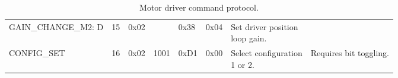 \begin{sidewaystable}[]
\begin{tabular}{llllllll}
GAIN\_CHANGE\_M2: D & 15                    & 0x02                  &                                  & 0x38                   & 0x04                    & \pbox{20cm}{Set driver position\\ loop gain.}       &                        \\
CONFIG\_SET        & 16                    & 0x02                  & 1001                             & 0xD1                   & 0x00                    & \pbox{20cm}{Select configuration\\ 1 or 2.}         & Requires bit toggling.
\end{tabular}
\caption{Motor driver command protocol.}
\label{tbl:motor-driver-protocol}
\end{sidewaystable}